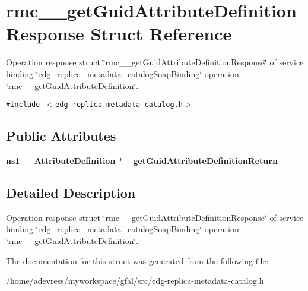 \section{rmc\_\-\_\-get\-Guid\-Attribute\-Definition\-Response Struct Reference}
\label{structrmc____getGuidAttributeDefinitionResponse}
Operation response struct \char`\"{}rmc\_\-\_\-get\-Guid\-Attribute\-Definition\-Response\char`\"{} of service binding \char`\"{}edg\_\-replica\_\-metadata\_\-catalog\-Soap\-Binding\char`\"{} operation \char`\"{}rmc\_\-\_\-get\-Guid\-Attribute\-Definition\char`\"{}.  


{\tt \#include $<$edg-replica-metadata-catalog.h$>$}

\subsection*{Public Attributes}
\begin{CompactItemize}
\item 
\bf{ns1\_\-\_\-Attribute\-Definition} $\ast$ \textbf{\_\-get\-Guid\-Attribute\-Definition\-Return}\label{structrmc____getGuidAttributeDefinitionResponse_7f5e45d6921c3b8f54c6706ae4d85937}

\end{CompactItemize}


\subsection{Detailed Description}
Operation response struct \char`\"{}rmc\_\-\_\-get\-Guid\-Attribute\-Definition\-Response\char`\"{} of service binding \char`\"{}edg\_\-replica\_\-metadata\_\-catalog\-Soap\-Binding\char`\"{} operation \char`\"{}rmc\_\-\_\-get\-Guid\-Attribute\-Definition\char`\"{}. 



The documentation for this struct was generated from the following file:\begin{CompactItemize}
\item 
/home/adevress/myworkspace/gfal/src/edg-replica-metadata-catalog.h\end{CompactItemize}
